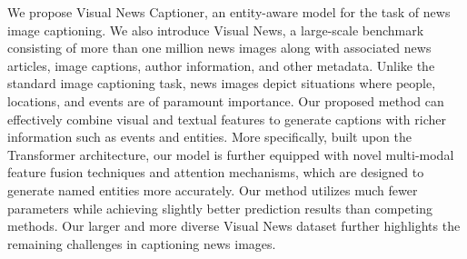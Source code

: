 We propose Visual News Captioner, an entity-aware model for the task of news image captioning. We also introduce Visual News, a large-scale benchmark consisting of more than one million news images along with associated news articles, image captions, author information, and other metadata. Unlike the standard image captioning task, news images depict situations where people, locations, and events are of paramount importance. Our proposed method can effectively combine visual and textual features to generate captions with richer information such as events and entities. More specifically, built upon the Transformer architecture, our model is further equipped with novel multi-modal feature fusion techniques and attention mechanisms, which are designed to generate named entities more accurately. Our method utilizes much fewer parameters while achieving slightly better prediction results than competing methods. Our larger and more diverse Visual News dataset further highlights the remaining challenges in captioning news images.
